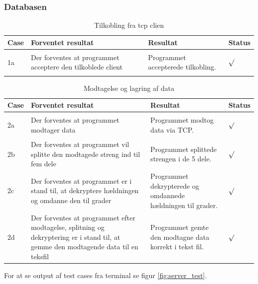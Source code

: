 \subsubsection{Databasen}
\begin{table}[H]
\caption{Tilkobling fra tcp clien}
\centering
\begin{tabular}{| p{1cm}  | p{6cm} | p{5cm} | p{1cm} |}
\hline
Case &Forventet resultat &Resultat &Status\\\hline
1a &Der forventes at programmet acceptere den tilkoblede client & Programmet accepterede tilkobling. &\begin{Huge}$\surd$\end{Huge} \\\hline 
\end{tabular}
\end{table}

\begin{table}[H]
\caption{Modtagelse og lagring af data}
\centering
\begin{tabular}{| p{1cm}  | p{6cm} | p{5cm} | p{1cm} |}
\hline
Case &Forventet resultat &Resultat &Status\\\hline
2a &Der forventes at programmet modtager data  & Programmet modtog data via TCP. &\begin{Huge}$\surd$\end{Huge} \\\hline 
2b &Der forventes at programmet vil splitte den modtagede streng ind til fem dele  & Programmet splittede strengen i de 5 dele. &\begin{Huge}$\surd$\end{Huge} \\\hline
2c &Der forventes at programmet er i stand til, at dekryptere hældningen og omdanne den til grader  & Programmet dekrypterede og omdannede hældningen til grader. &\begin{Huge}$\surd$\end{Huge} \\\hline
2d &Der forventes at programmet efter modtagelse, splitning og dekryptering er i stand til, at gemme den modtagende data til en teksfil  & Programmet gemte den modtagne data korrekt i tekst fil. &\begin{Huge}$\surd$\end{Huge} \\\hline
\end{tabular}
\end{table}
For at se output af test cases fra terminal se figur \ref{fig:server_test}.

